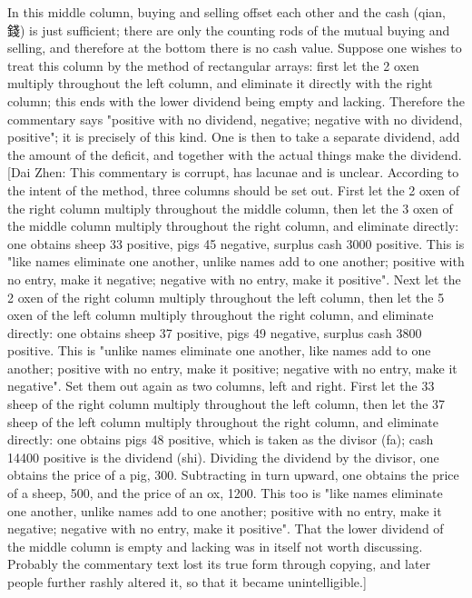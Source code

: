 \documentclass[11pt]{article}
\newenvironment{uniten}{\par\small\color{black!85}}{\par\medskip}
\begin{document}
\begin{uniten}In this middle column, buying and selling offset each other and the cash (qian, 錢) is just sufficient; there are only the counting rods of the mutual buying and selling, and therefore at the bottom there is no cash value. Suppose one wishes to treat this column by the method of rectangular arrays: first let the 2 oxen multiply throughout the left column, and eliminate it directly with the right column; this ends with the lower dividend being empty and lacking. Therefore the commentary says "positive with no dividend, negative; negative with no dividend, positive"; it is precisely of this kind. One is then to take a separate dividend, add the amount of the deficit, and together with the actual things make the dividend. [Dai Zhen: This commentary is corrupt, has lacunae and is unclear. According to the intent of the method, three columns should be set out. First let the 2 oxen of the right column multiply throughout the middle column, then let the 3 oxen of the middle column multiply throughout the right column, and eliminate directly: one obtains sheep 33 positive, pigs 45 negative, surplus cash 3000 positive. This is "like names eliminate one another, unlike names add to one another; positive with no entry, make it negative; negative with no entry, make it positive". Next let the 2 oxen of the right column multiply throughout the left column, then let the 5 oxen of the left column multiply throughout the right column, and eliminate directly: one obtains sheep 37 positive, pigs 49 negative, surplus cash 3800 positive. This is "unlike names eliminate one another, like names add to one another; positive with no entry, make it positive; negative with no entry, make it negative". Set them out again as two columns, left and right. First let the 33 sheep of the right column multiply throughout the left column, then let the 37 sheep of the left column multiply throughout the right column, and eliminate directly: one obtains pigs 48 positive, which is taken as the divisor (fa); cash 14400 positive is the dividend (shi). Dividing the dividend by the divisor, one obtains the price of a pig, 300. Subtracting in turn upward, one obtains the price of a sheep, 500, and the price of an ox, 1200. This too is "like names eliminate one another, unlike names add to one another; positive with no entry, make it negative; negative with no entry, make it positive". That the lower dividend of the middle column is empty and lacking was in itself not worth discussing. Probably the commentary text lost its true form through copying, and later people further rashly altered it, so that it became unintelligible.]\end{uniten}
\end{document}
